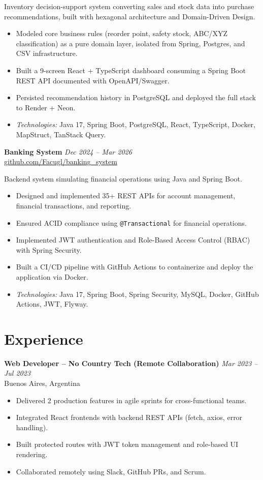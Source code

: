 \documentclass[11pt,a4paper]{article}
\newcommand{\entry}[3]{%
  \noindent\textbf{#1} \hfill \textit{#2} \\
  #3
}
\begin{document}
\noindent Inventory decision-support system converting sales and stock data into purchase recommendations, built with hexagonal architecture and Domain-Driven Design.
\begin{itemize}
  \item Modeled core business rules (reorder point, safety stock, ABC/XYZ classification) as a pure domain layer, isolated from Spring, Postgres, and CSV infrastructure.
  \item Built a 9-screen React + TypeScript dashboard consuming a Spring Boot REST API documented with OpenAPI/Swagger.
  \item Persisted recommendation history in PostgreSQL and deployed the full stack to Render + Neon.
  \item \textit{Technologies:} Java 17, Spring Boot, PostgreSQL, React, TypeScript, Docker, MapStruct, TanStack Query.
\end{itemize}

\vspace{5pt}
\entry{Banking System}{Dec 2024 -- Mar 2026}{\href{https://github.com/Facugl/banking_system}{github.com/Facugl/banking\_system}}
\vspace{3pt}

\noindent Backend system simulating financial operations using Java and Spring Boot.
\begin{itemize}
  \item Designed and implemented 35+ REST APIs for account management, financial transactions, and reporting.
  \item Ensured ACID compliance using \texttt{@Transactional} for financial operations.
  \item Implemented JWT authentication and Role-Based Access Control (RBAC) with Spring Security.
  \item Built a CI/CD pipeline with GitHub Actions to containerize and deploy the application via Docker.
  \item \textit{Technologies:} Java 17, Spring Boot, Spring Security, MySQL, Docker, GitHub Actions, JWT, Flyway.
\end{itemize}

\section*{Experience}
\entry{Web Developer -- No Country Tech (Remote Collaboration)}{Mar 2023 -- Jul 2023}{Buenos Aires, Argentina}
\vspace{1pt}
\begin{itemize}
  \item Delivered 2 production features in agile sprints for cross-functional teams.
  \item Integrated React frontends with backend REST APIs (fetch, axios, error handling).
  \item Built protected routes with JWT token management and role-based UI rendering.
  \item Collaborated remotely using Slack, GitHub PRs, and Scrum.
\end{itemize}
\end{document}
